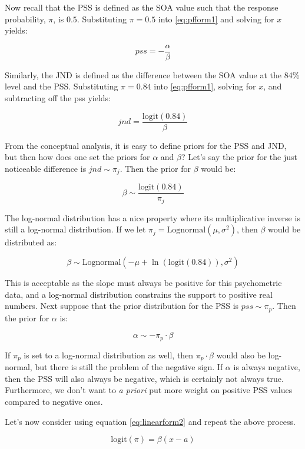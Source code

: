 \documentclass[11pt, oneside, openany]{scrbook}
\begin{document}
Now recall that the PSS is defined as the SOA value such that the response probability, \(\pi\), is \(0.5\). Substituting \(\pi = 0.5\) into \eqref{eq:pfform1} and solving for \(x\) yields:

\[pss = -\frac{\alpha}{\beta}\]

Similarly, the JND is defined as the difference between the SOA value at the 84\% level and the PSS. Substituting \(\pi = 0.84\) into \eqref{eq:pfform1}, solving for \(x\), and subtracting off the pss yields:

\begin{equation}
  jnd = \frac{\mathrm{logit}(0.84)}{\beta}
  \label{eq:jnd1}
\end{equation}

From the conceptual analysis, it is easy to define priors for the PSS and JND, but then how does one set the priors for \(\alpha\) and \(\beta\)? Let's say the prior for the just noticeable difference is \(jnd \sim \pi_j\). Then the prior for \(\beta\) would be:

\[\beta \sim \frac{\mathrm{logit}(0.84)}{\pi_j}\]

The log-normal distribution has a nice property where its multiplicative inverse is still a log-normal distribution. If we let \(\pi_j = \mathrm{Lognormal}(\mu, \sigma^2)\), then \(\beta\) would be distributed as:

\[
\beta \sim \mathrm{Lognormal}(-\mu + \ln(\mathrm{logit}(0.84)), \sigma^2)
\]

This is acceptable as the slope must always be positive for this psychometric data, and a log-normal distribution constrains the support to positive real numbers. Next suppose that the prior distribution for the PSS is \(pss \sim \pi_p\). Then the prior for \(\alpha\) is:

\[\alpha \sim -\pi_p \cdot \beta\]

If \(\pi_p\) is set to a log-normal distribution as well, then \(\pi_p \cdot \beta\) would also be log-normal, but there is still the problem of the negative sign. If \(\alpha\) is always negative, then the PSS will also always be negative, which is certainly not always true. Furthermore, we don't want to \emph{a priori} put more weight on positive PSS values compared to negative ones.

Let's now consider using equation \eqref{eq:linearform2} and repeat the above process.

\begin{equation}
  \mathrm{logit}(\pi) = \beta(x - a)
  \label{eq:pfform2}
\end{equation}
\end{document}
